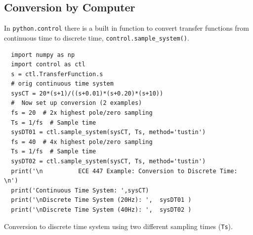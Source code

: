 
\subsection{Conversion  by  Computer}

In {\tt python.control} there is a built in function to convert transfer functions
from continuous time to discrete time, {\tt control.sample\_system()}.


\begin{listing}
\begin{verbatim}
  import numpy as np
  import control as ctl
  s = ctl.TransferFunction.s
  # orig continuous time system
  sysCT = 20*(s+1)/((s+0.01)*(s+0.20)*(s+10))
  #  Now set up conversion (2 examples)
  fs = 20  # 2x highest pole/zero sampling
  Ts = 1/fs  # Sample time
  sysDT01 = ctl.sample_system(sysCT, Ts, method='tustin')
  fs = 40  # 4x highest pole/zero sampling
  Ts = 1/fs  # Sample time
  sysDT02 = ctl.sample_system(sysCT, Ts, method='tustin')
  print('\n          ECE 447 Example: Conversion to Discrete Time: \n')
  print('Continuous Time System: ',sysCT)
  print('\nDiscrete Time System (20Hz): ',  sysDT01 )
  print('\nDiscrete Time System (40Hz): ',  sysDT02 )
\end{verbatim}
\caption{Conversion to discrete time system using two different sampling times ({\tt Ts}).}
\label{lst:basicTustin}
\end{listing}


